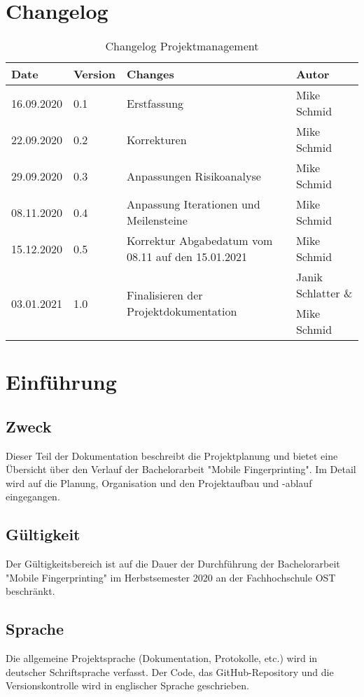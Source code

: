 \section{Changelog}
\begin{table}[H]
	\centering
	\begin{tabularx}{\linewidth}{l l X l}
		\toprule 
		\textbf{Date} & \textbf{Version} & \textbf{Changes} & \textbf{Autor} \\
		\midrule
		16.09.2020 & 0.1 & Erstfassung & Mike Schmid \\
		22.09.2020 & 0.2 & Korrekturen & Mike Schmid \\
		29.09.2020 & 0.3 & Anpassungen Risikoanalyse & Mike Schmid \\
		08.11.2020 & 0.4 & Anpassung Iterationen und Meilensteine & Mike Schmid \\
		15.12.2020 & 0.5 & Korrektur Abgabedatum vom 08.11 auf den 15.01.2021 & Mike Schmid \\
		\multirow{2}{*}{03.01.2021} & \multirow{2}{*}{1.0} & \multirow{2}{=}{Finalisieren der Projektdokumentation} & Janik Schlatter \& \\
		& & & Mike Schmid\\
		\bottomrule 
	\end{tabularx} 
	\caption{Changelog Projektmanagement} 
\end{table}

\clearpage

\section{Einführung} 

\subsection*{Zweck}
Dieser Teil der Dokumentation beschreibt die Projektplanung und bietet 
eine Übersicht über den Verlauf der Bachelorarbeit "Mobile Fingerprinting". 
Im Detail wird auf die Planung, Organisation und den Projektaufbau und -ablauf 
eingegangen.

\subsection*{Gültigkeit}
Der Gültigkeitsbereich ist auf die Dauer der Durchführung der Bachelorarbeit 
"Mobile Fingerprinting" im Herbstsemester 2020 an der Fachhochschule OST 
beschränkt.

\subsection*{Sprache}
Die allgemeine Projektsprache (Dokumentation, Protokolle, etc.) wird in 
deutscher Schriftsprache verfasst. 
Der Code, das GitHub-Repository und die Versionskontrolle wird in 
englischer Sprache geschrieben.

